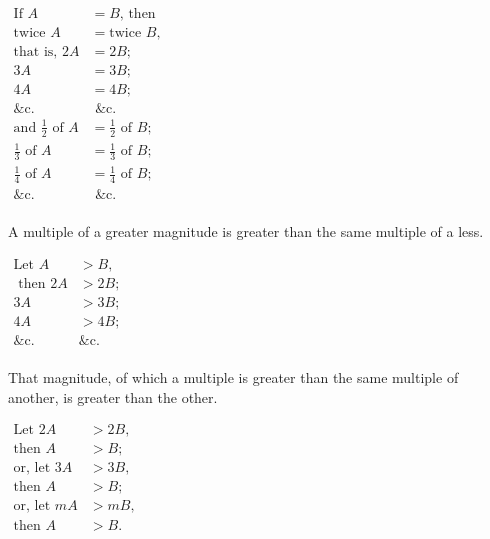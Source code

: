 \documentclass[booklanguage=english]{byrnebook}
\begin{document}
\begin{center}
$
\begin{aligned}
	\mbox{If } A &= B \mbox{, then}\\
	\mbox{twice } A &= \mbox{twice } B \mbox{,}\\
	\mbox{that is, }2A &= 2B \mbox{;}\\
	3A &= 3B \mbox{;}\\
	4A &= 4B \mbox{;}\\
	\mbox{\&c.} & \mbox{ \&c.}\\
	\mbox{and } \frac{1}{2} \mbox{ of } A &= \frac{1}{2} \mbox{ of } B \mbox{;}\\
	\frac{1}{3} \mbox{ of } A &= \frac{1}{3} \mbox{ of } B \mbox{;}\\
	\frac{1}{4} \mbox{ of } A &= \frac{1}{4} \mbox{ of } B \mbox{;}\\
	\mbox{\&c. } & \mbox{ \&c.}\\
\end{aligned}
$
\end{center}

\startaxiom{}\label{ax:V.II}
A multiple of a greater magnitude is greater than the same multiple of a less.

\begin{center}
$\begin{aligned}
	\mbox{Let } A &> B \mbox{,} \\
	\mbox{ then } 2A &> 2B \mbox{;}\\
	3A&> 3B \mbox{;} \\
	4A &> 4B \mbox{;}\\
	\mbox{\&c. } &\mbox{\&c.} \\
\end{aligned}
$
\end{center}

\startaxiom{}\label{ax:V.III}
That magnitude, of which a multiple is greater than the same multiple of another, is greater than the other.

\begin{center}
$\begin{aligned}
\mbox{Let } 2A &> 2B \mbox{,}\\
\mbox{then } A &> B \mbox{;}\\
\mbox{or, let } 3A &> 3B \mbox{,}\\
\mbox{then } A &> B \mbox{;}\\
\mbox{or, let } mA &> mB  \mbox{,}\\
\mbox{then } A &> B \mbox{.}\\
\end{aligned}$
\end{center}
\end{document}
